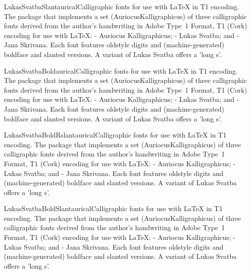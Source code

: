 \documentclass{ddltxtyp}
\begin{document}
\begin{package}{LukasSvatbaSlant}{aurical}{Calligraphic fonts for use with {\LaTeX} in T1 encoding.}
The package that implements a set (AuriocusKalligraphicus) of
three calligraphic fonts derived from the author's handwriting
in Adobe Type~1 Format, T1 (Cork) encoding for use with {\LaTeX}:
- Auriocus Kalligraphicus; - Lukas Svatba; and - Jana Skrivana.
Each font features oldstyle digits and (machine-generated)
boldface and slanted versions. A variant of Lukas Svatba offers
a 'long s'.
\end{package}
\begin{package}{LukasSvatbaBold}{aurical}{Calligraphic fonts for use with {\LaTeX} in T1 encoding.}
The package that implements a set (AuriocusKalligraphicus) of
three calligraphic fonts derived from the author's handwriting
in Adobe Type~1 Format, T1 (Cork) encoding for use with {\LaTeX}:
- Auriocus Kalligraphicus; - Lukas Svatba; and - Jana Skrivana.
Each font features oldstyle digits and (machine-generated)
boldface and slanted versions. A variant of Lukas Svatba offers
a 'long s'.
\end{package}
\begin{package}{LukasSvatbaBoldRslant}{aurical}{Calligraphic fonts for use with {\LaTeX} in T1 encoding.}
The package that implements a set (AuriocusKalligraphicus) of
three calligraphic fonts derived from the author's handwriting
in Adobe Type~1 Format, T1 (Cork) encoding for use with {\LaTeX}:
- Auriocus Kalligraphicus; - Lukas Svatba; and - Jana Skrivana.
Each font features oldstyle digits and (machine-generated)
boldface and slanted versions. A variant of Lukas Svatba offers
a 'long s'.
\end{package}
\begin{package}{LukasSvatbaBoldSlant}{aurical}{Calligraphic fonts for use with {\LaTeX} in T1 encoding.}
The package that implements a set (AuriocusKalligraphicus) of
three calligraphic fonts derived from the author's handwriting
in Adobe Type~1 Format, T1 (Cork) encoding for use with {\LaTeX}:
- Auriocus Kalligraphicus; - Lukas Svatba; and - Jana Skrivana.
Each font features oldstyle digits and (machine-generated)
boldface and slanted versions. A variant of Lukas Svatba offers
a 'long s'.
\end{package}

\end{document}
